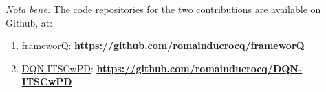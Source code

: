 \textit{Nota bene:} The code repositories for the two contributions are available on Github, at:
\begin{enumerate}
\setlength\itemsep{-0.5em}
    \item \underline{frameworQ}: \textbf{\url{https://github.com/romainducrocq/frameworQ}}
    \item \underline{DQN-ITSCwPD}: \textbf{\url{https://github.com/romainducrocq/DQN-ITSCwPD}}
\end{enumerate}

\pagebreak